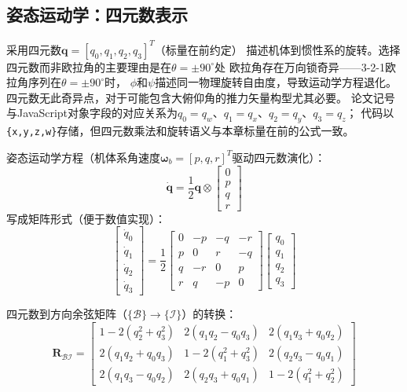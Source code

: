 \subsection{姿态运动学：四元数表示}

采用四元数$\bm{q} = [q_0, q_1, q_2, q_3]^T$（标量在前约定）
描述机体到惯性系的旋转。选择四元数而非欧拉角的主要理由是在$\theta = \pm 90^\circ$处
欧拉角存在万向锁奇异——3-2-1欧拉角序列在$\theta = \pm 90^\circ$时，
$\phi$和$\psi$描述同一物理旋转自由度，导致运动学方程退化。
四元数无此奇异点，对于可能包含大俯仰角的推力矢量构型尤其必要\cite{markley2014fundamentals,kuipers1999quaternions}。
论文记号与JavaScript对象字段的对应关系为$q_0=q_w$、$q_1=q_x$、$q_2=q_y$、$q_3=q_z$；
代码以\texttt{\{x,y,z,w\}}存储，但四元数乘法和旋转语义与本章标量在前的公式一致。

姿态运动学方程（机体系角速度$\bm{\omega}_b = [p, q, r]^T$驱动四元数演化）：
\begin{equation}
    \dot{\bm{q}} = \frac{1}{2} \bm{q} \otimes
    \begin{bmatrix} 0 \\ p \\ q \\ r \end{bmatrix}
    \label{eq:quaternion_kinematics}
\end{equation}
写成矩阵形式（便于数值实现）：
\begin{equation}
    \begin{bmatrix} \dot{q}_0 \\ \dot{q}_1 \\ \dot{q}_2 \\ \dot{q}_3 \end{bmatrix}
    = \frac{1}{2}
    \begin{bmatrix}
        0 & -p & -q & -r \\
        p &  0 &  r & -q \\
        q & -r &  0 &  p \\
        r &  q & -p &  0
    \end{bmatrix}
    \begin{bmatrix} q_0 \\ q_1 \\ q_2 \\ q_3 \end{bmatrix}
    \label{eq:quaternion_matrix}
\end{equation}

四元数到方向余弦矩阵（$\{\mathcal{B}\}\to\{\mathcal{I}\}$）的转换：
\begin{equation}
    \bm{R}_{\mathcal{B}\mathcal{I}} =
    \begin{bmatrix}
        1-2(q_2^2+q_3^2) & 2(q_1 q_2 - q_0 q_3) & 2(q_1 q_3 + q_0 q_2) \\
        2(q_1 q_2 + q_0 q_3) & 1-2(q_1^2+q_3^2) & 2(q_2 q_3 - q_0 q_1) \\
        2(q_1 q_3 - q_0 q_2) & 2(q_2 q_3 + q_0 q_1) & 1-2(q_1^2+q_2^2)
    \end{bmatrix}
    \label{eq:dcm_from_quaternion}
\end{equation}

